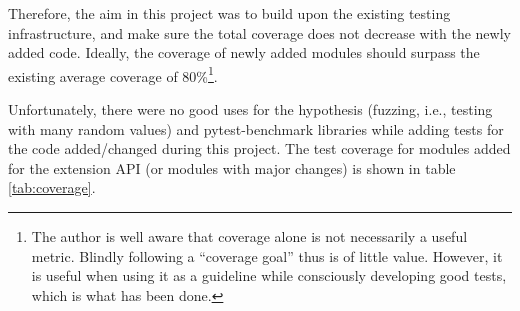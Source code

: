 Therefore, the aim in this project was to build upon the existing testing
infrastructure, and make sure the total coverage does not decrease with the
newly added code. Ideally, the coverage of newly added modules should surpass
the existing average coverage of 80\%\footnote{The author is well aware that
  coverage alone is not necessarily a useful metric. Blindly following a
  ``coverage goal'' thus is of little value. However, it is useful when using it
  as a guideline while consciously developing good tests, which is what has been
  done.}.

Unfortunately, there were no good uses for the hypothesis (fuzzing, i.e.,
testing with many random values) and pytest-benchmark libraries while adding
tests for the code added/changed during this project. The test coverage for
modules added for the extension API (or modules with major changes) is shown in
table \ref{tab:coverage}.

